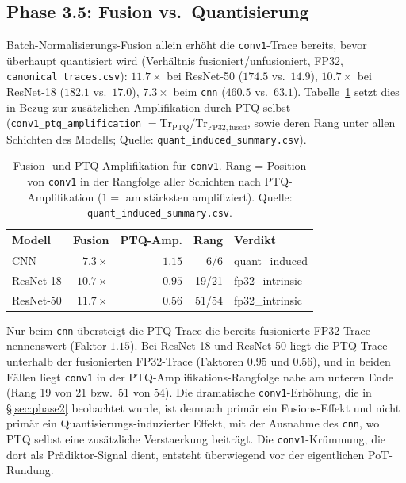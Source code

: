 \subsection{Phase 3.5: Fusion vs.\ Quantisierung}
\label{sec:phase35}

Batch-Normalisierungs-Fusion allein erhöht die \texttt{conv1}-Trace bereits, bevor überhaupt quantisiert wird (Verhältnis fusioniert/unfusioniert, FP32, \texttt{canonical\_traces.csv}): $11.7\times$ bei ResNet-50 ($174.5$ vs.\ $14.9$), $10.7\times$ bei ResNet-18 ($182.1$ vs.\ $17.0$), $7.3\times$ beim \texttt{cnn} ($460.5$ vs.\ $63.1$). Tabelle~\ref{tab:fusion} setzt dies in Bezug zur zusätzlichen Amplifikation durch PTQ selbst (\texttt{conv1\_ptq\_amplification} $=\mathrm{Tr}_{\mathrm{PTQ}}/\mathrm{Tr}_{\mathrm{FP32,fused}}$, sowie deren Rang unter allen Schichten des Modells; Quelle: \texttt{quant\_induced\_summary.csv}).

\begin{table}[t]
\centering
\small
\caption{Fusion- und PTQ-Amplifikation für \texttt{conv1}. Rang = Position von \texttt{conv1} in der Rangfolge aller Schichten nach PTQ-Amplifikation ($1=$ am stärksten amplifiziert). Quelle: \texttt{quant\_induced\_summary.csv}.}
\label{tab:fusion}
\begin{tabular}{lrrrl}
\toprule
Modell & Fusion & PTQ-Amp. & Rang & Verdikt \\
\midrule
CNN & $7.3\times$ & $1.15$ & 6/6 & quant\_induced \\
ResNet-18 & $10.7\times$ & $0.95$ & 19/21 & fp32\_intrinsic \\
ResNet-50 & $11.7\times$ & $0.56$ & 51/54 & fp32\_intrinsic \\
\bottomrule
\end{tabular}
\end{table}

Nur beim \texttt{cnn} übersteigt die PTQ-Trace die bereits fusionierte FP32-Trace nennenswert (Faktor $1.15$). Bei ResNet-18 und ResNet-50 liegt die PTQ-Trace unterhalb der fusionierten FP32-Trace (Faktoren $0.95$ und $0.56$), und in beiden Fällen liegt \texttt{conv1} in der PTQ-Amplifikations-Rangfolge nahe am unteren Ende (Rang 19 von 21 bzw.\ 51 von 54). Die dramatische \texttt{conv1}-Erhöhung, die in \S\ref{sec:phase2} beobachtet wurde, ist demnach primär ein Fusions-Effekt und nicht primär ein Quantisierungs-induzierter Effekt, mit der Ausnahme des \texttt{cnn}, wo PTQ selbst eine zusätzliche Verstaerkung beiträgt. Die \texttt{conv1}-Krümmung, die dort als Prädiktor-Signal dient, entsteht überwiegend vor der eigentlichen PoT-Rundung.

